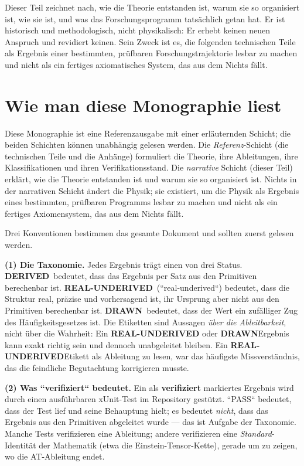 \documentclass[10pt,twoside,openany]{book}
\newcommand{\derived}{\textbf{DERIVED}}
\newcommand{\realunder}{\textbf{REAL-UNDERIVED}}
\newcommand{\drawn}{\textbf{DRAWN}}
\begin{document}
Dieser Teil zeichnet nach, wie die Theorie entstanden ist, warum sie so organisiert ist,
wie sie ist, und was das Forschungsprogramm tatsächlich getan hat. Er ist historisch und
methodologisch, nicht physikalisch: Er erhebt keinen neuen Anspruch und revidiert keinen.
Sein Zweck ist es, die folgenden technischen Teile als Ergebnis einer bestimmten,
prüfbaren Forschungstrajektorie lesbar zu machen und nicht als ein fertiges axiomatisches
System, das aus dem Nichts fällt.

\chapter{Wie man diese Monographie liest}
\label{ch:reading}

Diese Monographie ist eine Referenzausgabe mit einer erläuternden Schicht; die beiden
Schichten können unabhängig gelesen werden. Die \emph{Referenz}-Schicht (die technischen
Teile und die Anhänge) formuliert die Theorie, ihre Ableitungen, ihre Klassifikationen und
ihren Verifikationsstand. Die \emph{narrative} Schicht (dieser Teil) erklärt, wie die
Theorie entstanden ist und warum sie so organisiert ist. Nichts in der narrativen Schicht
ändert die Physik; sie existiert, um die Physik als Ergebnis eines bestimmten, prüfbaren
Programms lesbar zu machen und nicht als ein fertiges Axiomensystem, das aus dem Nichts
fällt.

Drei Konventionen bestimmen das gesamte Dokument und sollten zuerst gelesen werden.

\textbf{(1) Die Taxonomie.} Jedes Ergebnis trägt einen von drei Status.
\derived\ bedeutet, dass das Ergebnis per Satz aus den Primitiven berechenbar ist.
\realunder\ (``real-underived``) bedeutet, dass die Struktur real, präzise und vorhersagend
ist, ihr Ursprung aber nicht aus den Primitiven berechenbar ist. \drawn\ bedeutet, dass der
Wert ein zufälliger Zug des Häufigkeitsgesetzes ist. Die Etiketten sind Aussagen \emph{über
die Ableitbarkeit}, nicht über die Wahrheit: Ein \realunder\- oder \drawn\-Ergebnis kann
exakt richtig sein und dennoch unabgeleitet bleiben. Ein \realunder\-Etikett als Ableitung
zu lesen, war das häufigste Missverständnis, das die feindliche Begutachtung korrigieren
musste.

\textbf{(2) Was ``verifiziert`` bedeutet.} Ein als \textbf{verifiziert} markiertes Ergebnis
wird durch einen ausführbaren xUnit-Test im Repository gestützt. ``PASS`` bedeutet, dass der
Test lief und seine Behauptung hielt; es bedeutet \emph{nicht}, dass das Ergebnis aus den
Primitiven abgeleitet wurde --- das ist Aufgabe der Taxonomie. Manche Tests verifizieren
eine Ableitung; andere verifizieren eine \emph{Standard}-Identität der Mathematik (etwa
die Einstein-Tensor-Kette), gerade um zu zeigen, wo die AT-Ableitung endet.
\end{document}
